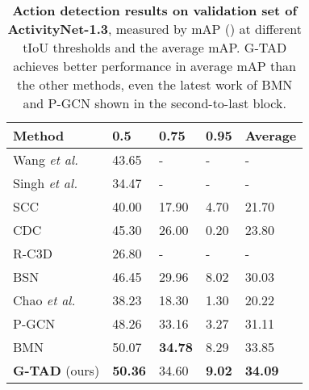 \documentclass[10pt,twocolumn,letterpaper]{article}
\begin{document}
\begin{table}[tbp]
\centering
\caption{\textbf{Action detection results on validation set of ActivityNet-1.3}, measured by mAP () at different tIoU thresholds and the average mAP. G-TAD achieves better performance in average mAP than the other methods, even the latest work of BMN and P-GCN shown in the  second-to-last block. 
}
\small
\begin{tabular}{p{2.1cm}p{0.62cm}<{\centering}p{0.62cm}<{\centering}p{0.62cm}<{\centering}p{0.9cm}<{\centering}}
\toprule
Method  & 0.5  &  0.75  & 0.95 & Average\\
\hline
Wang \textit{et al.} \cite{wang2016uts}    & 43.65 & -  & - & -\\
Singh \textit{et al.} \cite{singh2016untrimmed} & 34.47 & - & - & - \\
SCC \cite{heilbron2017scc}   & 40.00 & 17.90  & 4.70   & 21.70  \\
CDC \cite{shou2017cdc} & 45.30 & 26.00 & 0.20 & 23.80 \\
R-C3D \cite{xu2017r} & 26.80 & - & - & - \\
BSN \cite{lin2018bsn} & 46.45  & 29.96 & 8.02  & 30.03  \\
Chao \textit{et al.} \cite{chao2018rethinking} & 38.23 & 18.30 & 1.30 & 20.22 \\ \hline
P-GCN \cite {zeng2019graph} &48.26 &33.16 &3.27 &31.11  \\
BMN \cite{lin2019bmn} & { 50.07} & \textbf{34.78} & { 8.29} & { 33.85}  \\
\hline
\textbf{G-TAD} (ours)  & \textbf{50.36} & {34.60} & \textbf{9.02} & {\bf 34.09} \\
\bottomrule
\end{tabular}
\label{tab:sota_anet}
\end{table}
\end{document}
